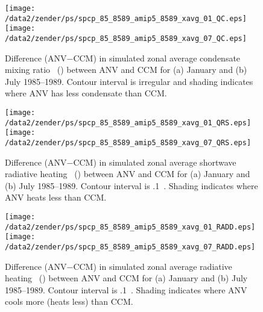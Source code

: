 \documentclass[twocolumn,final]{article}
\begin{document}
\begin{figure}
\begin{center}
\texttt{[image: /data2/zender/ps/spcp\_85\_8589\_amip5\_8589\_xavg\_01\_QC.eps]}\vfill
\texttt{[image: /data2/zender/ps/spcp\_85\_8589\_amip5\_8589\_xavg\_07\_QC.eps]}\vfill
\end{center}
\caption[Difference (ANV$-$CCM) in simulated zonal average condensate
mixing ratio \qc\ between ANV and CCM for January and July
1985--1989]{
Difference (ANV$-$CCM) in simulated zonal average condensate mixing
ratio \qc\ (\mgxkg) between ANV and CCM for (a) January and (b) July 
1985--1989. 
Contour interval is irregular and shading indicates where ANV has less
condensate than CCM.
\label{fig:xavg_8589_QC}}   
\end{figure}

\begin{figure}
\begin{center}
\texttt{[image: /data2/zender/ps/spcp\_85\_8589\_amip5\_8589\_xavg\_01\_QRS.eps]}\vfill
\texttt{[image: /data2/zender/ps/spcp\_85\_8589\_amip5\_8589\_xavg\_07\_QRS.eps]}\vfill
\end{center}
\caption[Difference (ANV$-$CCM) in simulated zonal average shortwave
radiative heating \QRS\ between ANV and CCM for January and
July 1985--1989]{
Difference (ANV$-$CCM) in simulated zonal average shortwave radiative
heating \QR\ (\kxday) between ANV and CCM for (a) January and (b) July
1985--1989. 
Contour interval is .1~\kxday. 
Shading indicates where ANV heats less than CCM. 
\label{fig:xavg_8589_QRS}}   
\end{figure}

\begin{figure}
\begin{center}
\texttt{[image: /data2/zender/ps/spcp\_85\_8589\_amip5\_8589\_xavg\_01\_RADD.eps]}\vfill
\texttt{[image: /data2/zender/ps/spcp\_85\_8589\_amip5\_8589\_xavg\_07\_RADD.eps]}\vfill
\end{center}
\caption[Difference (ANV$-$CCM) in simulated zonal average radiative
heating \QR\ between ANV and CCM for January and July 1985--1989]{
Difference (ANV$-$CCM) in simulated zonal average radiative heating
\QR\ (\kxday) between ANV and CCM for (a) January and (b) July
1985--1989. 
Contour interval is .1~\kxday. 
Shading indicates where ANV cools more (heats less) than CCM. 
\label{fig:xavg_8589_RADD}}   
\end{figure}
\end{document}
